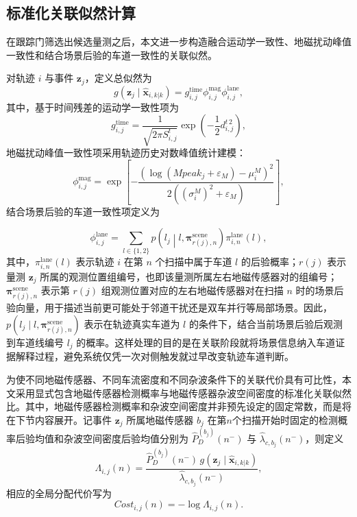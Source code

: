 \documentclass{xdupgthesis}
\begin{document}
\subsection{标准化关联似然计算}

在跟踪门筛选出候选量测之后，本文进一步构造融合运动学一致性、地磁扰动峰值一致性和结合场景后验的车道一致性的关联似然。

对轨迹 $i$ 与事件 $\mathbf z_j$，定义总似然为
\begin{equation}
	g(\mathbf z_j\mid \hat{\mathbf x}_{i,k|k})
	=
	g_{i,j}^{\mathrm{time}}
	\phi_{i,j}^{\mathrm{mag}}
	\phi_{i,j}^{\mathrm{lane}},
	\label{eq:ch3_total_likelihood}
\end{equation}
其中，基于时间残差的运动学一致性项为
\begin{equation}
	g_{i,j}^{\mathrm{time}}
	=
	\frac{1}{\sqrt{2\pi S^{t}_{i,j}}}
	\exp\left(-\frac{1}{2}d^{t\,2}_{i,j}\right),
	\label{eq:ch3_g_time}
\end{equation}
地磁扰动峰值一致性项采用轨迹历史对数峰值统计建模：
\begin{equation}
	\phi_{i,j}^{\mathrm{mag}}
	=
	\exp\left[
	-\frac{
		\left(
		\log(Mpeak_j+\varepsilon_M)-\mu_i^{M}
		\right)^2
	}{2\left((\sigma_i^{M})^2+\varepsilon_M\right)}
	\right],
	\label{eq:ch3_phi_mag}
\end{equation}
结合场景后验的车道一致性项定义为

\begin{equation}
	\phi_{i,j}^{\mathrm{lane}}
	=
	\sum_{l\in\{1,2\}}
	p\!\left(l_j\middle|l,\boldsymbol\pi_{r(j),n}^{\mathrm{scene}}\right)
	\pi_{i,n}^{\mathrm{lane}}(l),
	\label{eq:ch3_phi_lane}
\end{equation}
其中，$\pi_{i,n}^{\mathrm{lane}}(l)$ 表示轨迹 $i$ 在第 $n$ 个扫描中属于车道 $l$ 的后验概率；$r(j)$ 表示量测 $\mathbf z_j$ 所属的观测位置组编号，也即该量测所属左右地磁传感器对的组编号；$\boldsymbol\pi_{r(j),n}^{\mathrm{scene}}$ 表示第 $r(j)$ 组观测位置对应的左右地磁传感器对在扫描 $n$ 时的场景后验向量，用于描述当前更可能处于邻道干扰还是双车并行等局部场景。因此，$p(l_j\mid l,\boldsymbol\pi_{r(j),n}^{\mathrm{scene}})$ 表示在轨迹真实车道为 $l$ 的条件下，结合当前场景后验后观测到车道线编号 $l_j$ 的概率。这样处理的目的是在关联阶段就将场景信息纳入车道证据解释过程，避免系统仅凭一次对侧触发就过早改变轨迹车道判断。

为使不同地磁传感器、不同车流密度和不同杂波条件下的关联代价具有可比性，本文采用显式包含地磁传感器检测概率与地磁传感器杂波空间密度的标准化关联似然比。其中，地磁传感器检测概率和杂波空间密度并非预先设定的固定常数，而是将在下节内容展开。记事件 $\mathbf z_j$ 所属地磁传感器 $b_j$ 在第$n$个扫描开始时固定的检测概率后验均值和杂波空间密度后验均值分别为 $\hat P_D^{(b_j)}(n^-)$ 与 $\hat\lambda_{c,b_j}(n^-)$，则定义
\begin{equation}
	\Lambda_{i,j}(n)
	=
	\frac{\hat P_D^{(b_j)}(n^-)\,g(\mathbf z_j\mid \hat{\mathbf x}_{i,k|k})}{\hat\lambda_{c,b_j}(n^-)},
	\label{eq:ch3_assoc_ratio}
\end{equation}
相应的全局分配代价写为
\begin{equation}
	Cost_{i,j}(n)=-\log \Lambda_{i,j}(n).
	\label{eq:ch3_assoc_cost}
\end{equation}
\end{document}
